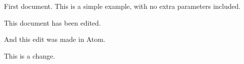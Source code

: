 \documentclass{article}
\begin{document}
First document. This is a simple example, with no
extra parameters included.

This document has been edited.

And this edit was made in Atom.

This is a change.
\end{document}
